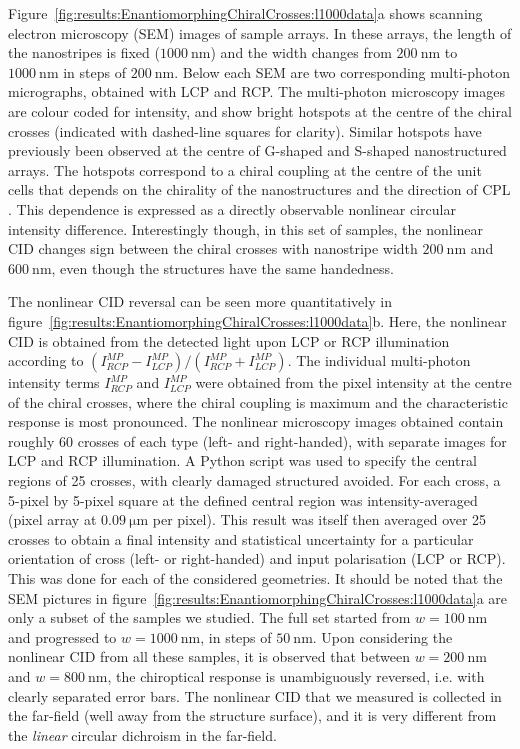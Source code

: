 Figure~\ref{fig:results:EnantiomorphingChiralCrosses:l1000data}a shows scanning electron microscopy (SEM) images of sample arrays. In these arrays, the length of the nanostripes is fixed ($\SI{1000}{\nano\m}$) and the width changes from $\SI{200}{\nano\m}$ to $\SI{1000}{\nano\m}$ in steps of $\SI{200}{\nano\m}$. Below each SEM are two corresponding multi-photon micrographs, obtained with LCP and RCP. The multi-photon microscopy images are colour coded for intensity, and show bright hotspots at the centre of the chiral crosses (indicated with dashed-line squares for clarity). 
Similar hotspots have previously been observed at the centre of G-shaped \cite{Valev2009a} and S-shaped \cite{Valev2014} nanostructured arrays. 
The hotspots correspond to a chiral coupling at the centre of the unit cells that depends on the chirality of the nanostructures and the direction of CPL \cite{Valev2014, Petralli-Mallow1993, Byers1994}. This dependence is expressed as a directly observable nonlinear circular intensity difference. Interestingly though, in this set of samples, the nonlinear CID changes sign between the chiral crosses with nanostripe width  $\SI{200}{\nano\m}$ and $\SI{600}{\nano\m}$, even though the structures have the same handedness.

The nonlinear CID reversal can be seen more quantitatively in figure~\ref{fig:results:EnantiomorphingChiralCrosses:l1000data}b. Here, the nonlinear CID is obtained from the detected light upon LCP or RCP illumination according to 
$(I_{RCP}^{MP}-I_{LCP}^{MP})/(I_{RCP}^{MP}+I_{LCP}^{MP})$. The individual multi-photon intensity terms $I_{RCP}^{MP}$ and $I_{LCP}^{MP}$ were obtained from the pixel intensity at the centre of the chiral crosses, where the chiral coupling is maximum and the characteristic response is most pronounced. 
The nonlinear microscopy images obtained contain roughly 60 crosses of each type (left- and right-handed), with separate images for LCP and RCP illumination. A Python script was used to specify the central regions of 25 crosses, with clearly damaged structured avoided. For each cross, a 5-pixel by 5-pixel square at the defined central region was intensity-averaged (pixel array at $\SI{0.09}{\micro\m}$ per pixel). This result was itself then averaged over 25 crosses to obtain a final intensity and statistical uncertainty for a particular orientation of cross (left- or right-handed) and input polarisation (LCP or RCP). This was done for each of the considered geometries. 
It should be noted that the SEM pictures in figure~\ref{fig:results:EnantiomorphingChiralCrosses:l1000data}a are only a subset of the samples we studied. The full set started from $w= \SI{100}{\nano\m}$ and progressed to $w=\SI{1000}{\nano\m}$, in steps of $\SI{50}{\nano\m}$. 
Upon considering the nonlinear CID from all these samples, it is observed that between $w=\SI{200}{\nano\m}$ and $w=\SI{800}{\nano\m}$, the chiroptical response is unambiguously reversed, i.e. with clearly separated error bars. The nonlinear CID that we measured is collected in the far-field (well away from the structure surface), and it is very different from the \textit{linear} circular dichroism in the far-field. 

